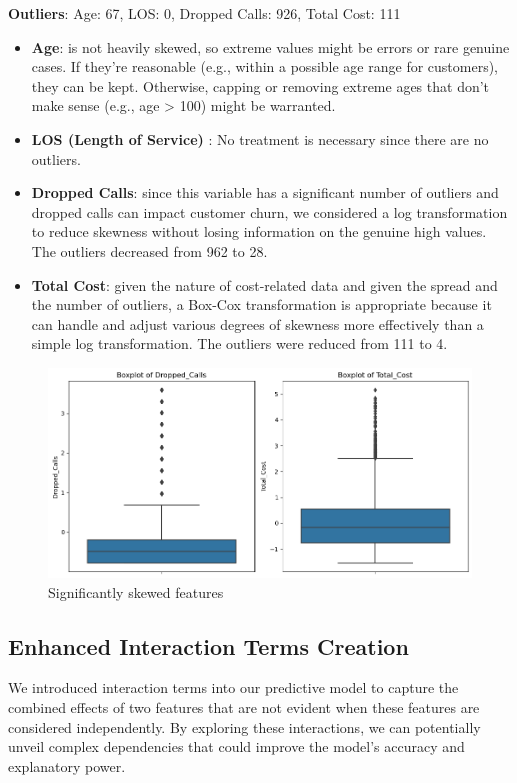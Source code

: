\documentclass{article}
\begin{document}
\textbf{Outliers}: Age: 67, LOS: 0, Dropped Calls: 926, Total Cost: 111

\begin{itemize}
    \item \textbf{Age}: is not heavily skewed, so extreme values might be errors or rare genuine cases. If they're reasonable (e.g., within a possible age range for customers), they can be kept. Otherwise, capping or removing extreme ages that don't make sense (e.g., age > 100) might be warranted.
    
\item \textbf{LOS (Length of Service)} : No treatment is necessary since there are no outliers.

\item \textbf{Dropped Calls}: since this variable has a significant number of outliers and dropped calls can impact customer churn, we considered a log transformation to reduce skewness without losing information on the genuine high values. The outliers decreased from 962 to 28.

\item \textbf{Total Cost}: given the nature of cost-related data and given the spread and the number of outliers, a Box-Cox transformation is appropriate because it can handle and adjust various degrees of skewness more effectively than a simple log transformation. The outliers were reduced from 111 to 4.

\end{itemize}


\begin{figure}[h]
\centering
\includegraphics[width=0.3\linewidth]{Significantly skewed features.png}
\caption{Significantly skewed features}
\label{fig:distribution}
\end{figure}



\subsection{Enhanced Interaction Terms Creation}
We introduced interaction terms into our predictive model to capture the combined effects of two features that are not evident when these features are considered independently. By exploring these interactions, we can potentially unveil complex dependencies that could improve the model's accuracy and explanatory power.
\end{document}
